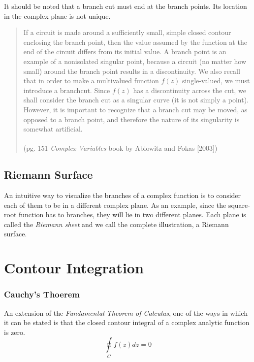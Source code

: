 \documentclass[letterpaper,11pt]{article}
\begin{document}
It should be noted that a branch cut must end at the branch points. Its location in the complex plane is not unique.

\begin{quotation}
If a circuit is made around a sufficiently small, simple closed contour enclosing the branch point,
then the value assumed by the function at the end of the circuit differs from
its initial value. A branch point is an example of a nonisolated singular point,
because a circuit (no matter how small) around the branch point results in a
discontinuity. We also recall that in order to make a multivalued function $f(z)$
single-valued, we must introduce a branchcut. Since $f(z)$ has a discontinuity
across the cut, we shall consider the branch cut as a singular curve (it is
not simply a point). However, it is important to recognize that a branch cut
may be moved, as opposed to a branch point, and therefore the nature of its
singularity is somewhat artificial.
\\ \\
(pg. 151 \emph{Complex Variables} book by Ablowitz and Fokas [2003])
\end{quotation}



\subsection*{Riemann Surface}

An intuitive way to visualize the branches of a complex function is to consider each of them to be in a different complex plane. As an example, since the square-root function has to branches, they will lie in two different planes. Each plane is called the \emph{Riemann sheet} and we call the complete illustration, a Riemann surface.
\section*{Contour Integration}



\subsubsection*{Cauchy's Thoerem}

An extension of the \emph{Fundamental Theorem of Calculus}, one of the ways in which it can be stated is that the closed contour integral of a complex analytic function is zero.
\begin{equation}
\oint \limits_C f(z) dz = 0
\end{equation}
\end{document}
